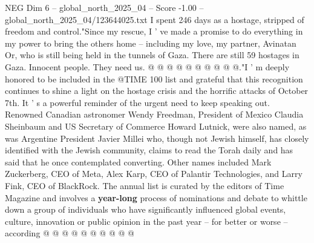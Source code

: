 \begin{textsample}{NEG Dim 6 – global\_north\_2025\_04 – Score -1.00 – global\_north\_2025\_04/123644025.txt}
I spent 246 days as a hostage, stripped of freedom and control."Since my rescue, I ' ve made a promise to do everything in my power to bring the others home -- including my love, my partner, Avinatan Or, who is still being held in the tunnels of Gaza.
There are still 59 hostages in Gaza.
Innocent people.
They need us. @ @ @ @ @ @ @ @ @ @."I ' m deeply honored to be included in the @TIME 100 list and grateful that this recognition continues to shine a light on the hostage crisis and the horrific attacks of October 7th.
It ' s a powerful reminder of the urgent need to keep speaking out.
Renowned Canadian astronomer Wendy Freedman, President of Mexico Claudia Sheinbaum and US Secretary of Commerce Howard Lutnick, were also named, as was Argentine President Javier Millei who, though not Jewish himself, has closely identified with the Jewish community, claims to read the Torah daily and has said that he once contemplated converting.
Other names included Mark Zuckerberg, CEO of Meta, Alex Karp, CEO of Palantir Technologies, and Larry Fink, CEO of BlackRock.
The annual list is curated by the editors of Time Magazine and involves a \textbf{year-long} process of nominations and debate to whittle down a group of individuals who have significantly influenced global events, culture, innovation or public opinion in the past year -- for better or worse -- according @ @ @ @ @ @ @ @ @ @

\end{textsample}
